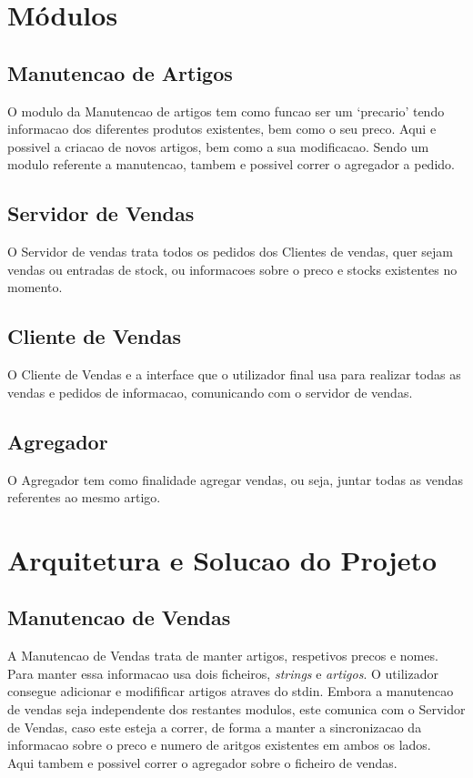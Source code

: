 \documentclass[a4paper]{report}
\begin{document}
\chapter{Módulos}\label{chap:api}

\section{Manutencao de Artigos}

O modulo da Manutencao de artigos tem como funcao ser um `precario'
tendo informacao dos diferentes produtos existentes, bem como o seu
preco. Aqui e possivel a criacao de novos artigos, bem como a sua
modificacao. Sendo um modulo referente a manutencao, tambem e possivel
correr o agregador a pedido.

\section{Servidor de Vendas}

O Servidor de vendas trata todos os pedidos dos Clientes de vendas,
quer sejam vendas ou entradas de stock, ou informacoes sobre o preco
e stocks existentes no momento.

\section{Cliente de Vendas}

O Cliente de Vendas e a interface que o utilizador final usa para
realizar todas as vendas e pedidos de informacao, comunicando com
o servidor de vendas.

\section{Agregador}

O Agregador tem como finalidade agregar vendas, ou seja, juntar
todas as vendas referentes ao mesmo artigo.

\chapter{Arquitetura e Solucao do Projeto}

\section{Manutencao de Vendas}

A Manutencao de Vendas trata de manter artigos, respetivos precos
e nomes. Para manter essa informacao usa dois ficheiros, \textit{strings}
e \textit{artigos}. O utilizador consegue adicionar e modifificar artigos
atraves do stdin. Embora a manutencao de vendas seja independente dos 
restantes modulos, este comunica com o Servidor de Vendas, caso este esteja
a correr, de forma a manter a sincronizacao  da informacao sobre o preco 
e numero de aritgos existentes em ambos os lados.\\
Aqui tambem e possivel correr o agregador sobre o ficheiro de vendas.
\end{document}

